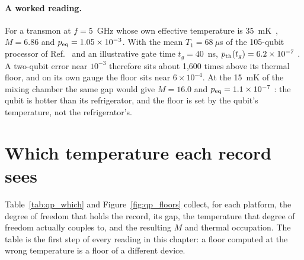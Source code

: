 \paragraph{A worked reading.} For a transmon at $f=5$~GHz whose own effective temperature is 35~mK~\cite{Jin2015}, $M=6.86$ and
$p_{\rm eq}=1.05\times10^{-3}$. With the mean $T_1=68~\mu$s of the 105-qubit processor of Ref.~\cite{GoogleWillow2025} and an
illustrative gate time $t_g=40$~ns, $p_{\rm th}(t_g)=6.2\times10^{-7}$ \calc. A two-qubit error near $10^{-3}$ therefore sits about
1,600 times above its thermal floor, and on its own gauge the floor sits near $6\times10^{-4}$. At the 15~mK of the mixing chamber the
same gap would give $M=16.0$ and $p_{\rm eq}=1.1\times10^{-7}$ \calc: the qubit is hotter than its refrigerator, and the floor is set by
the qubit's temperature, not the refrigerator's.

\section{Which temperature each record sees}\label{sec:qp_which}
Table~\ref{tab:qp_which} and Figure~\ref{fig:qp_floors} collect, for each platform, the degree of freedom that holds the record, its gap,
the temperature that degree of freedom actually couples to, and the resulting $M$ and thermal occupation. The table is the first step of
every reading in this chapter: a floor computed at the wrong temperature is a floor of a different device.

